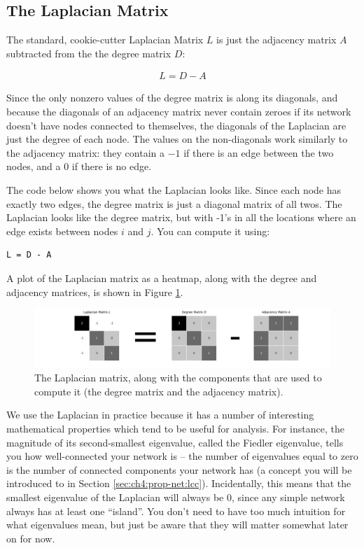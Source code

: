 \subsection{The Laplacian Matrix}

The standard, cookie-cutter Laplacian Matrix $L$ \cite{Chung1996Dec} is just the adjacency matrix $A$ subtracted from the the degree matrix $D$:

\begin{align*}
 L = D - A
\end{align*}

Since the only nonzero values of the degree matrix is along its diagonals, and because the diagonals of an adjacency matrix never contain zeroes if its network doesn't have nodes connected to themselves, the diagonals of the Laplacian are just the degree of each node. The values on the non-diagonals work similarly to the adjacency matrix: they contain a $-1$ if there is an edge between the two nodes, and a $0$ if there is no edge.

The code below shows you what the Laplacian looks like. Since each node has exactly two edges, the degree matrix is just a diagonal matrix of all twos. The Laplacian looks like the degree matrix, but with -1's in all the locations where an edge exists between nodes $i$ and $j$. You can compute it using:

\begin{lstlisting}[style=python]
L = D - A
\end{lstlisting}

A plot of the Laplacian matrix as a heatmap, along with the degree and adjacency matrices, is shown in Figure \ref{fig:ch4:simple_lap}.
\begin{figure}[h]
    \centering
    \includegraphics[width=\linewidth]{representations/ch4/Images/simple_lapl.png}
    \caption[Laplacian matrix]{The Laplacian matrix, along with the components that are used to compute it (the degree matrix and the adjacency matrix).}
    \label{fig:ch4:simple_lap}
\end{figure}

We use the Laplacian in practice because it has a number of interesting mathematical properties which tend to be useful for analysis. For instance, the magnitude of its second-smallest eigenvalue, called the Fiedler eigenvalue, tells you how well-connected your network is -- the number of eigenvalues equal to zero is the number of connected components your network has (a concept you will be introduced to in Section \ref{sec:ch4:prop-net:lcc}). Incidentally, this means that the smallest eigenvalue of the Laplacian will always be 0, since any simple network always has at least one ``island''. You don't need to have too much intuition for what eigenvalues mean, but just be aware that they will matter somewhat later on for now.

